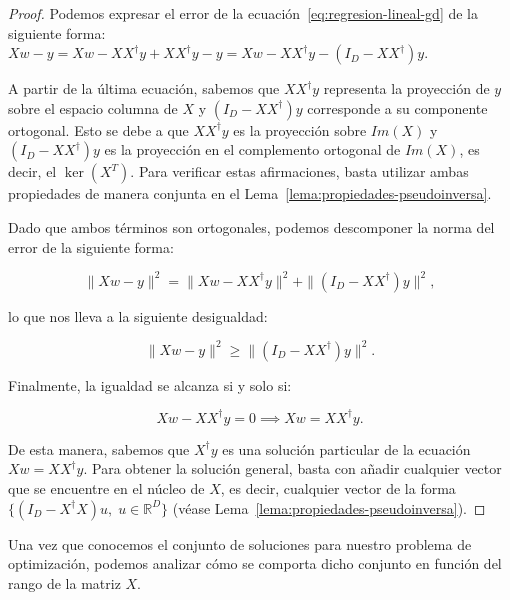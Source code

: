 \begin{proof}
    Podemos expresar el error de la ecuación~\eqref{eq:regresion-lineal-gd} de la siguiente forma: $Xw - y = Xw - XX^{\dagger}y +XX^{\dagger}y - y = Xw - XX^{\dagger}y - (I_D - XX^{\dagger})y$.

    A partir de la última ecuación, sabemos que $XX^{\dagger}y$ representa la proyección de $y$ sobre el espacio columna de $X$ y $(I_D - XX^{\dagger})y$ corresponde a su componente ortogonal. Esto se debe a que $XX^{\dagger}y$ es la proyección sobre $Im(X)$ y $(I_D - XX^{\dagger})y$ es la proyección en el complemento ortogonal de $Im(X)$, es decir, el $\ker(X^{T})$. Para verificar estas afirmaciones, basta utilizar ambas propiedades de manera conjunta en el Lema~\ref{lema:propiedades-pseudoinversa}.

    Dado que ambos términos son ortogonales, podemos descomponer la norma del error de la siguiente forma:

    \[
        \| Xw - y \|^{2} = \| Xw - XX^{\dagger}y \|^{2} + \| (I_D - XX^{\dagger})y \|^{2}
,    \]

    lo que nos lleva a la siguiente desigualdad:

    \[
        \| Xw - y \|^{2} \geq \| (I_D - XX^{\dagger})y \|^{2}.
    \]

    Finalmente, la igualdad se alcanza si y solo si:

    \[
        Xw - XX^{\dagger}y = 0 \implies  Xw = XX^{\dagger}y.
    \]

    De esta manera, sabemos que $X^{\dagger}y$ es una solución particular de la ecuación $Xw = XX^{\dagger}y$. Para obtener la solución general, basta con añadir cualquier vector que se encuentre en el núcleo de $X$, es decir, cualquier vector de la forma $\{ (I_D-X^{\dagger}X)u, \; u \in \mathbb{R}^{D} \}$ (véase Lema~\ref{lema:propiedades-pseudoinversa}).
\end{proof}

Una vez que conocemos el conjunto de soluciones para nuestro problema de optimización, podemos analizar cómo se comporta dicho conjunto en función del rango de la matriz $X$.

